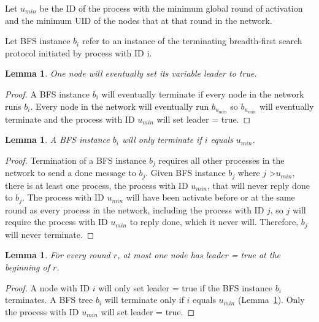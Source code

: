 \documentclass[english]{article}
\newtheorem{lemma}[theorem]{Lemma}
\begin{document}
\begin{definition}
Let $u_{min}$ be the ID of the process with the minimum global round of activation and the minimum UID  of the nodes that at that round in the network. 
\end{definition}

\begin{definition}
Let BFS instance $b_i$ refer to an instance of the terminating breadth-first search protocol initiated by process with ID i.
\end{definition}


\begin{lemma}
\label{LELivenessStaggered}
  One node will eventually set its variable leader to true.
\end{lemma}
\begin{proof}
A BFS instance $b_i$ will eventually terminate if every node in the network runs $b_i$. 
Every node in the network will eventually run $b_{u_{min}}$ so $b_{u_{min}}$ will eventually terminate and the process with ID $u_{min}$ will set leader = true.
\end{proof}


\begin{lemma}
\label{BFSTerminationStaggered}
  A BFS instance $b_i$ will only terminate if $i$ equals $u_{min}$.
\end{lemma}
\begin{proof}
Termination of a BFS instance $b_j$ requires all other processes in the network to send a done message to $b_j$.
Given BFS instance $b_j$ where $j$ \textgreater $u_{min}$, there is at least one process, the process with ID $u_{min}$, that will never reply done to $b_j$. The process with ID $u_{min}$ will have been activate before or at the same round as every process in the network, including the process with ID $j$, so $j$ will require the process with ID $u_{min}$ to reply done, which it never will.
Therefore, $b_j$ will never terminate.
\end{proof}


\begin{lemma}
\label{LESafetyStaggered}
For every round $r$, at most one node has leader = true at the beginning of $r$.
\end{lemma}
\begin{proof}
A node with ID $i$ will only set leader = true if the BFS instance $b_i$ terminates.
A BFS tree $b_i$ will terminate only if $i$ equals $u_{min}$ (Lemma~\ref{BFSTerminationStaggered}).
Only the process with ID $u_{min}$ will set leader = true. 
\end{proof}
\end{document}
